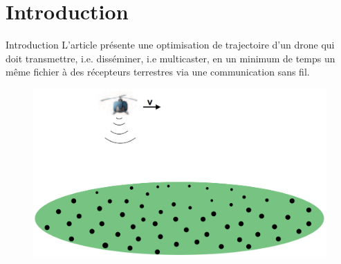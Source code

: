 

\section {Introduction}

\begin{frame}{Introduction}
  L'article présente une optimisation de trajectoire d'un drone qui doit transmettre, i.e. disséminer, i.e multicaster,
  en un minimum de temps un même fichier à des récepteurs terrestres via une communication sans fil.
  
  \begin{figure}
  	\centering
  	\includegraphics[width=0.7\linewidth]{images/multicast}
  	\caption{}
  	\label{fig:multicast}
  \end{figure}
  
  
\end{frame}

